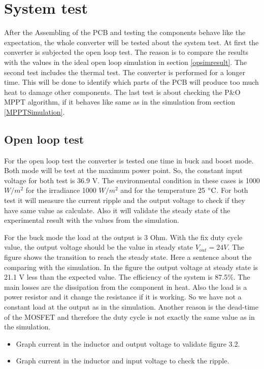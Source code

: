\section{System test}
After the Assembling of the PCB and testing the components behave like the expectation, the whole converter will be tested about the system test. At first the converter is subjected the open loop test. The reason is to compare the results with the values in the ideal open loop simulation in section \ref{opsimresult}. The second test includes the thermal test. The converter is performed for a longer time. This will be done to identify which parts of the PCB will produce too much heat to damage other components. The last test is about checking the P\&O MPPT algorithm, if it behaves like same as in the simulation from section \ref{MPPTSimulation}.

\subsection{Open loop test}
For the open loop test the converter is tested one time in buck and boost mode. Both mode will be test at the maximum power point. So, the constant input voltage for both test is 36.9 V. The environmental condition in these cases is 1000 $W /m^2$ for the irradiance 1000 $W /m^2$ and for the temperature 25 $\decC$. For both test it will measure the current ripple and the output voltage to check if they have same value as calculate. Also it will validate the steady state of the experimental result with the values from the simulation.

For the buck mode the load at the output is 3 Ohm. With the fix duty cycle value, the output voltage should be the value in steady state $V_{out} = 24 V$. The figure shows the transition to reach the steady state. Here a sentence about the comparing with the simulation.  In the figure the output voltage at steady state is 21.1 V less than the expected value. The efficiency of the system is 87.5$\%$. The main losses are the dissipation from the component in heat. Also the load is a power resistor and it change the resistance if it is working. So we have not a constant load at the output as in the simulation. Another reason is the dead-time of the MOSFET and therefore the duty cycle is not exactly the same value as in the simulation. 

\begin{itemize}
	\item Graph current in the inductor and output voltage to validate figure 3.2. 
	\item Graph current in the inductor and input voltage to check the ripple. 
\end{itemize}

